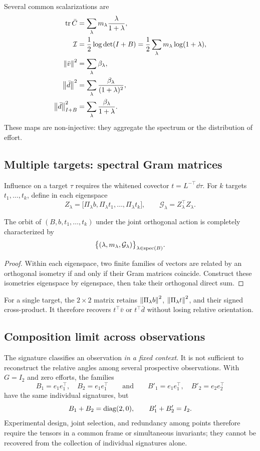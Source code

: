 Several common scalarizations are
\begin{align}
\operatorname{tr} \bar C
&=\sum_\lambda m_\lambda\frac{\lambda}{1+\lambda},\label{eq:traceC}\\
\mathcal I
&=\frac12\log\det(I+B)
=\frac12\sum_\lambda m_\lambda\log(1+\lambda),\label{eq:infoB}\\
\left\lVert \bar v\right\rVert^2
&=\sum_\lambda\beta_\lambda,\label{eq:normv}\\
\left\lVert \bar d\right\rVert^2
&=\sum_\lambda\frac{\beta_\lambda}{(1+\lambda)^2},\label{eq:normd}\\
\left\lVert \bar d\right\rVert_{I+B}^2
&=\sum_\lambda\frac{\beta_\lambda}{1+\lambda}.\label{eq:postnormd}
\end{align}
These maps are non-injective: they aggregate the spectrum or the distribution of effort.

\subsection{Multiple targets: spectral Gram matrices}
Influence on a target $\tau$ requires the whitened covector $t=L^{-\top}\dd\tau$. For $k$ targets $t_1,\dots,t_k$, define in each eigenspace
\[
Z_\lambda=
\bigl[\Pi_\lambda b,\Pi_\lambda t_1,\dots,\Pi_\lambda t_k\bigr],
\qquad
\mathcal G_\lambda=Z_\lambda^\top Z_\lambda.
\]

\begin{theorem}
The orbit of $(B,b,t_1,\dots,t_k)$ under the joint orthogonal action is completely characterized by
\begin{equation}
\bigl\{(\lambda,m_\lambda,\mathcal G_\lambda)\bigr\}_{\lambda\in\operatorname{spec}(B)}.
\label{eq:target-signature}
\end{equation}
\end{theorem}
\begin{proof}
Within each eigenspace, two finite families of vectors are related by an orthogonal isometry if and only if their Gram matrices coincide. Construct these isometries eigenspace by eigenspace, then take their orthogonal direct sum.
\end{proof}
For a single target, the $2\times2$ matrix retains $\left\lVert \Pi_\lambda b\right\rVert^2$, $\left\lVert \Pi_\lambda t\right\rVert^2$, and their signed cross-product. It therefore recovers $t^\top\bar v$ or $t^\top\bar d$ without losing relative orientation.

\subsection{Composition limit across observations}
The signature classifies an observation \emph{in a fixed context}. It is not sufficient to reconstruct the relative angles among several prospective observations. With $G=I_2$ and zero efforts, the families
\[
B_1=e_1e_1^\top,\quad B_2=e_1e_1^\top
\qquad\text{and}\qquad
B'_1=e_1e_1^\top,\quad B'_2=e_2e_2^\top
\]
have the same individual signatures, but
\[
B_1+B_2=\operatorname{diag}(2,0),
\qquad
B'_1+B'_2=I_2.
\]
Experimental design, joint selection, and redundancy among points therefore require the tensors in a common frame or simultaneous invariants; they cannot be recovered from the collection of individual signatures alone.

